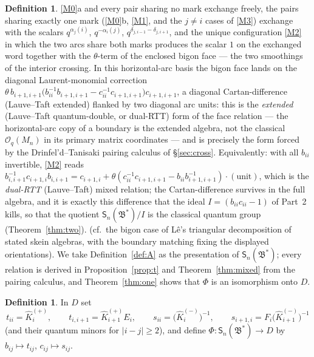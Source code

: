\documentclass[11pt]{article}
\theoremstyle{definition}
\newtheorem{definition}[theorem]{Definition}
\theoremstyle{remark}
\newcommand{\B}{\mathfrak{B}}
\newcommand{\Sn}{\mathsf{S}_n}
\newcommand{\hK}{\hat K}
\newcommand{\tht}{\theta}
\begin{document}
\begin{definition}
\eqref{M0}a and every pair sharing no mark exchange freely, the
pairs sharing exactly one mark (\eqref{M0}b, \eqref{M1}, and the
$j\neq i$ cases of \eqref{M3}) exchange with the scalars
$q^{\alpha_j(i)}$, $q^{-\alpha_i(j)}$, $q^{\delta_{j,i-1}-
\delta_{j,i+1}}$, and the unique configuration \eqref{M2} in which
the two arcs share both marks produces the scalar $1$ on the
exchanged word together with the $\tht$-term of the enclosed bigon
face — the two smoothings of the interior crossing.  In this
horizontal-arc basis the bigon face lands on the diagonal
Laurent-monomial correction
$\tht\,b_{i+1,i+1}\bigl(b_{ii}^{-1}b_{i+1,i+1}
 -c_{ii}^{-1}c_{i+1,i+1}\bigr)c_{i+1,i+1}$,
a diagonal Cartan-difference (Lauve--Taft extended) flanked by two
diagonal arc units: this is the
\emph{extended} (Lauve--Taft quantum-double, or dual-RTT) form of
the face relation — the horizontal-arc copy of a boundary is the
extended algebra, not the classical $\mathcal O_q(M_n)$ in its
primary matrix coordinates — and is precisely the form forced by
the Drinfel'd--Tanisaki pairing calculus of \S\ref{sec:cross}.
Equivalently: with all $b_{ii}$ invertible, \eqref{M2} reads
$b_{i,i+1}^{-1}c_{i+1,i}b_{i,i+1}
=c_{i+1,i}+\tht(c_{ii}^{-1}c_{i+1,i+1}-b_{ii}b_{i+1,i+1}^{-1})
 \cdot(\text{unit})$,
which is the \emph{dual-RTT} (Lauve--Taft) mixed relation; the
Cartan-difference survives in the full algebra, and it is exactly
this difference that the ideal $I=(b_{ii}c_{ii}-1)$ of Part~2 kills,
so that the quotient $\Sn(\B^*)/I$ is the classical quantum group
(Theorem~\ref{thm:two}).
(cf.\ the bigon case of L\^e's triangular decomposition of stated
skein algebras, with the boundary matching fixing the displayed
orientations).  We take Definition~\ref{def:A} as the presentation
of $\Sn(\B^*)$; every relation is derived in
Proposition~\ref{prop:t} and Theorem~\ref{thm:mixed} from the
pairing calculus, and Theorem~\ref{thm:one} shows that $\Phi$ is an
isomorphism onto $D$.
\end{definition}

\begin{definition}\label{def:phi}
In $D$ set
\begin{equation}
t_{ii}=\hK_i^{(+)},\qquad
t_{i,i+1}=\hK_{i+1}^{(+)}E_i,\qquad
s_{ii}=\bigl(\hK_i^{(-)}\bigr)^{-1},\qquad
s_{i+1,i}=F_i\bigl(\hK_{i+1}^{(-)}\bigr)^{-1}
\label{arcimg}\tag{arc-img}
\end{equation}
(and their quantum minors for $|i-j|\ge2$), and define
$\Phi:\Sn(\B^*)\to D$ by $b_{ij}\mapsto t_{ij}$,
$c_{ij}\mapsto s_{ij}$.
\end{definition}
\end{document}
